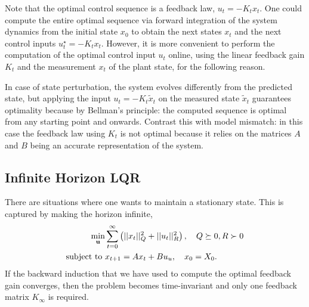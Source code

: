 Note that the optimal control sequence is a feedback law, $u_t=-K_tx_t$.
One could compute the entire optimal sequence via forward integration of the system dynamics from the initial state $x_0$ to obtain the next states $x_t$ and the next control inputs $u_t^\star = -K_tx_t$.
However, it is more convenient to perform the computation of the optimal control input $u_t$ online, using the linear feedback gain $K_t$ and the measurement $x_t$ of the plant state, for the following reason.

In case of state perturbation, the system evolves differently from the predicted state, but applying the input $u_t=-K_t\tilde{x}_t$ on the measured state $\tilde{x}_t$ guarantees optimality because by Bellman's principle: the computed sequence is optimal from any starting point and onwards. Contrast this with model mismatch: in this case the feedback law using $K_t$ is not optimal because it relies on the matrices $A$ and $B$ being an accurate representation of the system.


\subsection{Infinite Horizon LQR}
\label{sec:infinite-horizon-LQR}

There are situations where one wants to maintain a stationary state. This is captured by making the horizon infinite,
\begin{equation}
  \label{eq:infinite-horizon-LQR-formulation}
  \begin{aligned}
\min_{\boldsymbol{\mathrm{u}}} &\sum_{t=0}^\infty \left(||x_t||_Q^2 + ||u_t||_R^2 \right),\quad Q\succeq 0, R\succ 0 \\
    \text{subject to } &x_{t+1} = Ax_t + Bu_u,\quad x_0=X_0.
  \end{aligned}
\end{equation}
If the backward induction that we have used to compute the optimal feedback gain converges, then the problem becomes time-invariant and only one feedback matrix $K_\infty$ is required.

